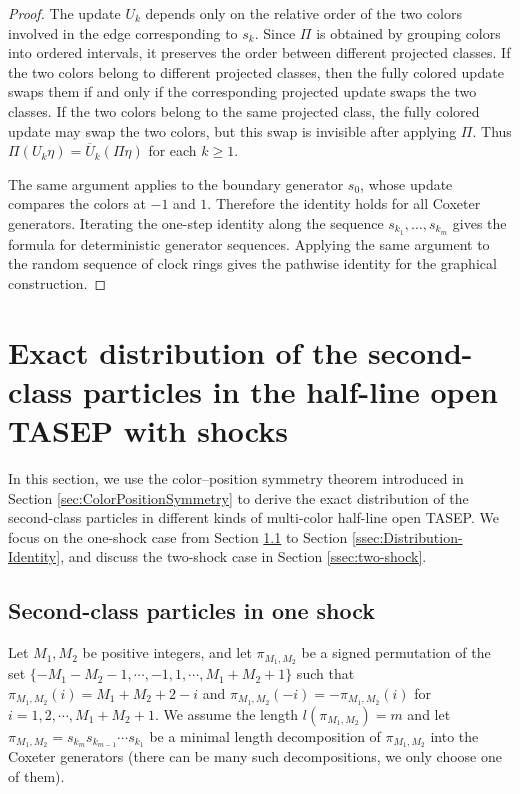 \documentclass[12pt,a4paper]{amsart}
\theoremstyle{remark}
\numberwithin{equation}{section} \numberwithin{theorem}{section}
\begin{document}
\begin{proof}
The update $U_k$ depends only on the relative order of the two colors involved in the edge corresponding to $s_k$. 
Since $\Pi$ is obtained by grouping colors into ordered intervals, it preserves the order between different projected classes. 
If the two colors belong to different projected classes, then the fully colored update swaps them if and only if the corresponding projected update swaps the two classes. 
If the two colors belong to the same projected class, the fully colored update may swap the two colors, but this swap is invisible after applying $\Pi$. 
Thus $\Pi(U_k\eta)=\overline U_k(\Pi\eta)$ for each $k\geq1$.

The same argument applies to the boundary generator $s_0$, whose update compares the colors at $-1$ and $1$. 
Therefore the identity holds for all Coxeter generators. 
Iterating the one-step identity along the sequence $s_{k_1},\ldots,s_{k_m}$ gives the formula for deterministic generator sequences. 
Applying the same argument to the random sequence of clock rings gives the pathwise identity for the graphical construction.
\end{proof}



\section{Exact distribution of the second-class particles in the half-line open TASEP with shocks}
\label{sec:distributional-identity}
In this section, we use the color--position symmetry theorem introduced in Section \ref{sec:ColorPositionSymmetry}
 to derive the exact distribution of the second-class particles in different kinds of multi-color half-line open TASEP. We focus on the one-shock case from Section \ref{ssec:one-shock} to Section \ref{ssec:Distribution-Identity}, and discuss the two-shock case in Section \ref{ssec:two-shock}.

\subsection{Second-class particles in one shock}
\label{ssec:one-shock}
Let $M_1, M_2$ be positive integers, and let $\pi_{M_1,M_2}$ be a signed permutation of the set $\{-M_1-M_2-1, \cdots, -1, 1, \cdots, M_1+M_2+1\}$ such that $\pi_{M_1,M_2}(i)=M_1+M_2+2-i$ and $\pi_{M_1,M_2}(-i)=-\pi_{M_1,M_2}(i)$ for $i=1,2, \cdots, M_1+M_2+1$. We assume the length $l(\pi_{M_1,M_2})=m$ and let $\pi_{M_1,M_2}=s_{k_m} s_{k_{m-1}} \cdots s_{k_1}$ be a minimal length decomposition of $\pi_{M_1,M_2}$ into the Coxeter generators (there can be many such decompositions, we only choose one of them).
\end{document}
